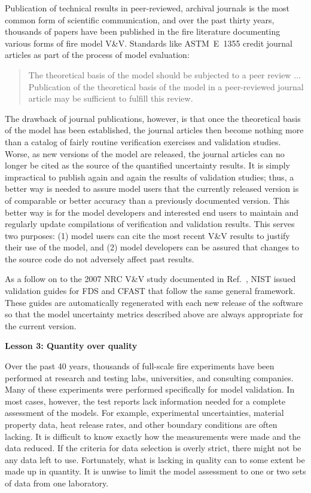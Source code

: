 \documentclass[fleqn,b5paper]{article}
\begin{document}
Publication of technical results in peer-reviewed, archival journals is the most common form of scientific communication, and over the past thirty years, thousands of papers have been published in the fire literature documenting various forms of fire model V\&V. Standards like ASTM~E~1355 credit journal articles as part of the process of model evaluation:
\begin{quote}
The theoretical basis of the model should be subjected to a peer review $\ldots$ Publication of the theoretical basis of the model in a peer-reviewed journal article may be sufficient to fulfill this review.
\end{quote}
The drawback of journal publications, however, is that once the theoretical basis of the model has been established, the journal articles then become nothing more than a catalog of fairly routine verification exercises and validation studies. Worse, as new versions of the model are released, the journal articles can no longer be cited as the source of the quantified uncertainty results. It is simply impractical to publish again and again the results of validation studies; thus, a better way is needed to assure model users that the currently released version is of comparable or better accuracy than a previously documented version. This better way is for the model developers and interested end users to maintain and regularly update compilations of verification and validation results. This serves two purposes: (1) model users can cite the most recent V\&V results to justify their use of the model, and (2) model developers can be assured that changes to the source code do not adversely affect past results.

As a follow on to the 2007 NRC V\&V study documented in Ref.~\cite{NUREG_1824}, NIST issued validation guides for FDS and CFAST that follow the same general framework. These guides are automatically regenerated with each new release of the software so that the model uncertainty metrics described above are always appropriate for the current version.

\vspace{\parskip}
{\bf Lesson 3: Quantity over quality}

Over the past 40 years, thousands of full-scale fire experiments have been performed at research and testing labs, universities, and consulting companies. Many of these experiments were performed specifically for model validation. In most cases, however, the test reports lack information needed for a complete assessment of the models. For example, experimental uncertainties, material property data, heat release rates, and other boundary conditions are often lacking. It is difficult to know exactly how the measurements were made and the data reduced. If the criteria for data selection is overly strict, there might not be any data left to use. Fortunately, what is lacking in quality can to some extent be made up in quantity. It is unwise to limit the model assessment to one or two sets of data from one laboratory.
\end{document}
